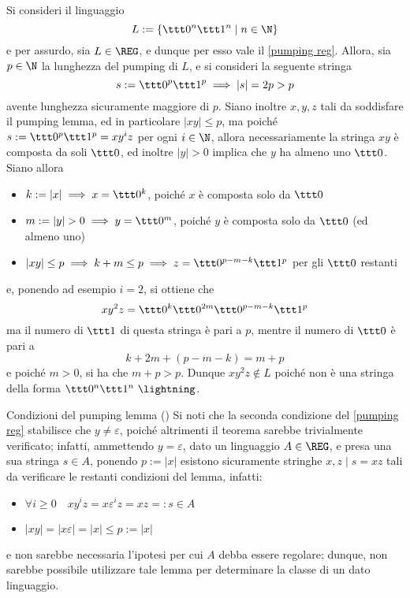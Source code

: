 \documentclass[a4paper, 12pt]{report}
\begin{document}
    \begin{example}
        \label{non reg ex}
        Si consideri il linguaggio $$L := \{\ttt 0 ^n \ttt 1 ^n \mid n \in \N\}$$ e per assurdo, sia $L \in \mathrm{\REG}$, e dunque per esso vale il \cref{pumping reg}. Allora, sia $p \in \N$ la lunghezza del pumping di $L$, e si consideri la seguente stringa $$s := \ttt 0 ^p \ttt 1^p \implies |s| = 2p > p$$ avente lunghezza sicuramente maggiore di $p$. Siano inoltre $x, y, z$ tali da soddisfare il pumping lemma, ed in particolare $|xy| \le p$, ma poiché $s := \ttt 0^p \ttt 1^p = xy^iz$ per ogni $i \in \N$, allora necessariamente la stringa $xy$ è composta da soli $\ttt 0$, ed inoltre $|y| > 0$ implica che $y$ ha almeno uno $\ttt 0$. Siano allora

        \begin{itemize}
            \item $k := |x| \implies x = \ttt 0^k$, poiché $x$ è composta solo da $\ttt 0$
            \item $m := |y| > 0 \implies y = \ttt 0^m$, poiché $y$ è composta solo da $\ttt 0$ (ed almeno uno)
            \item $|xy| \le p \implies k + m \le p \implies z = \ttt 0^{p-m-k} \ttt 1^p$ per gli $\ttt 0$ restanti
        \end{itemize}

        e, ponendo ad esempio $i = 2$, si ottiene che $$xy^2z = \ttt 0^k \ttt 0^{2m} \ttt 0^{p-m-k} \ttt 1^p$$ ma il numero di $\ttt 1$ di questa stringa è pari a $p$, mentre il numero di $\ttt 0$ è pari a $$k + 2m + (p - m - k) = m + p$$ e poiché $m > 0$, si ha che $m + p > p$. Dunque $xy^2z \notin L$ poiché non è una stringa della forma $\ttt 0 ^n \ttt 1^n \ \lightning$.
    \end{example}

    \begin{framedobs}{Condizioni del pumping lemma (\REG)}
        Si noti che la seconda condizione del \cref{pumping reg} stabilisce che $y \neq \varepsilon$, poiché altrimenti il teorema sarebbe trivialmente verificato; infatti, ammettendo $y = \varepsilon$, dato un linguaggio $A \in \mathrm{\REG}$, e presa una sua stringa $s \in A$, ponendo $p := |x|$ esistono sicuramente stringhe $x, z \mid s = xz$ tali da verificare le restanti condizioni del lemma, infatti:

        \begin{itemize}
            \item $\forall i \ge 0 \quad xy^iz = x \varepsilon^iz  = xz =: s \in A$
            \item $|xy| = |x \varepsilon| = |x| \le p := |x|$
        \end{itemize}

        e non sarebbe necessaria l'ipotesi per cui $A$ debba essere regolare; dunque, non sarebbe possibile utilizzare tale lemma per determinare la classe di un dato linguaggio.
    \end{framedobs}
\end{document}
